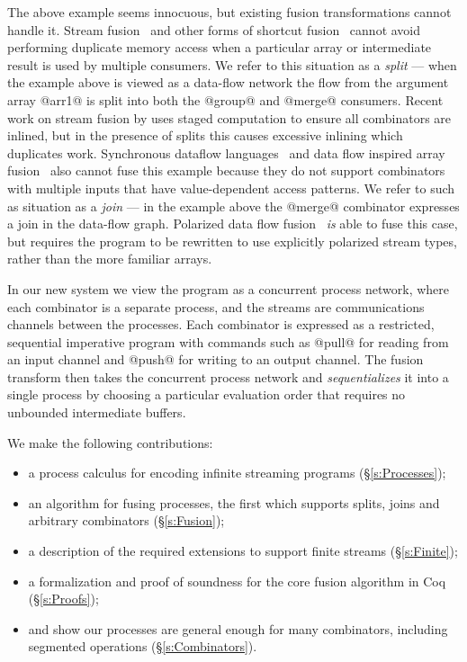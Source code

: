 The above example seems innocuous, but existing fusion transformations cannot handle it.
Stream fusion~\cite{coutts2007stream} and other forms of shortcut fusion~\cite{jones2001playing} cannot avoid performing duplicate memory access when a particular array or intermediate result is used by multiple consumers.
We refer to this situation as a \emph{split} --- when the example above is viewed as a data-flow network the flow from the argument array @arr1@ is split into both the @group@ and @merge@ consumers.
Recent work on stream fusion by \citet{kiselyov2016stream} uses staged computation to ensure all combinators are inlined, but in the presence of splits this causes excessive inlining which duplicates work.
Synchronous dataflow languages~\cite{mandel2010lucy} and data flow inspired array fusion~\cite{lippmeier2013data} also cannot fuse this example because they do not support combinators with multiple inputs that have value-dependent access patterns.
We refer to such as situation as a \emph{join} --- in the example above the @merge@ combinator expresses a join in the data-flow graph.
Polarized data flow fusion~\cite{lippmeier2016polarized} \emph{is} able to fuse this case, but requires the program to be rewritten to use explicitly polarized stream types, rather than the more familiar arrays.


In our new system we view the program as a concurrent process network, where each combinator is a separate process, and the streams are communications channels between the processes. Each combinator is expressed as a restricted, sequential imperative program with commands such as @pull@ for reading from an input channel and @push@ for writing to an output channel. The fusion transform then takes the concurrent process network and \emph{sequentializes} it into a single process by choosing a particular evaluation order that requires no unbounded intermediate buffers. 



We make the following contributions:
\begin{itemize}
\item a process calculus for encoding infinite streaming programs (\S\ref{s:Processes});
\item an algorithm for fusing processes, the first which supports splits, joins and arbitrary combinators (\S\ref{s:Fusion});
\item a description of the required extensions to support finite streams (\S\ref{s:Finite});
\item a formalization and proof of soundness for the core fusion algorithm in Coq (\S\ref{s:Proofs});
\item and show our processes are general enough for many combinators, including segmented operations (\S\ref{s:Combinators}).
\end{itemize}

